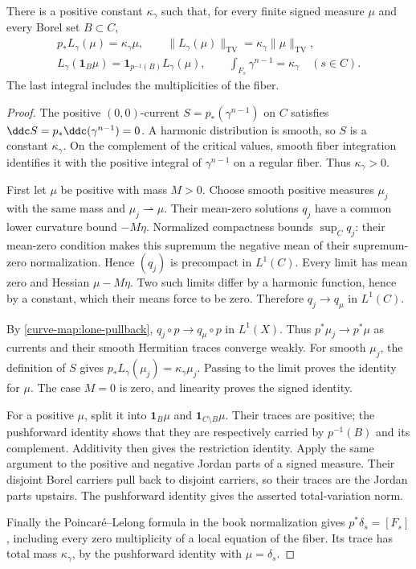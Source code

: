 \begin{lemma}\label{curve-map:gauduchon-trace}
There is a positive constant $\kappa_\gamma$ such that, for every
finite signed measure $\mu$ and every Borel set $B\subset C$,
\[
 \begin{gathered}
 p_*L_\gamma(\mu)=\kappa_\gamma\mu,\qquad
 \|L_\gamma(\mu)\|_{\mathrm{TV}}
               =\kappa_\gamma\|\mu\|_{\mathrm{TV}},\\
 L_\gamma(\mathbf1_B\mu)
            =\mathbf1_{p^{-1}(B)}L_\gamma(\mu),\qquad
 \int_{F_s}\gamma^{n-1}=\kappa_\gamma\quad(s\in C).
 \end{gathered}
\]
The last integral includes the multiplicities of the fiber.
\end{lemma}
\begin{proof}
The positive $(0,0)$-current $S=p_*(\gamma^{n-1})$ on $C$ satisfies
$\ddc S=p_*\ddc(\gamma^{n-1})=0$. A harmonic distribution is smooth,
so $S$ is a constant $\kappa_\gamma$. On the complement of the
critical values, smooth fiber integration identifies it with
the positive integral of $\gamma^{n-1}$ on a regular fiber.
Thus $\kappa_\gamma>0$.

First let $\mu$ be positive with mass $M>0$. Choose smooth
positive measures $\mu_j$ with the same mass and
$\mu_j\rightharpoonup\mu$. Their mean-zero solutions $q_j$ have
a common lower curvature bound $-M\eta$. Normalized compactness
bounds $\sup_Cq_j$: their mean-zero condition makes this
supremum the negative mean of their supremum-zero normalization.
Hence $(q_j)$ is precompact in $L^1(C)$. Every limit has mean
zero and Hessian $\mu-M\eta$. Two such limits differ by a
harmonic function, hence by a constant, which their means force
to be zero. Therefore $q_j\to q_\mu$ in $L^1(C)$.

By \cref{curve-map:lone-pullback}, $q_j\circ p\to q_\mu\circ p$
in $L^1(X)$. Thus $p^*\mu_j\to p^*\mu$ as currents and their
smooth Hermitian traces converge weakly. For smooth $\mu_j$,
the definition of $S$ gives
$p_*L_\gamma(\mu_j)=\kappa_\gamma\mu_j$. Passing to the limit
proves the identity for $\mu$. The case $M=0$ is zero, and
linearity proves the signed identity.

For a positive $\mu$, split it into $\mathbf1_B\mu$ and
$\mathbf1_{C\setminus B}\mu$. Their traces are positive; the
pushforward identity shows that they are respectively carried
by $p^{-1}(B)$ and its complement. Additivity then gives the
restriction identity. Apply the same argument to the positive
and negative Jordan parts of a signed measure. Their disjoint
Borel carriers pull back to disjoint carriers, so their traces
are the Jordan parts upstairs. The pushforward identity gives
the asserted total-variation norm.

Finally the Poincar\'e--Lelong formula in the book normalization
gives $p^*\delta_s=[F_s]$, including every zero multiplicity of
a local equation of the fiber. Its trace has total mass
$\kappa_\gamma$, by the pushforward identity with $\mu=\delta_s$.
\end{proof}

